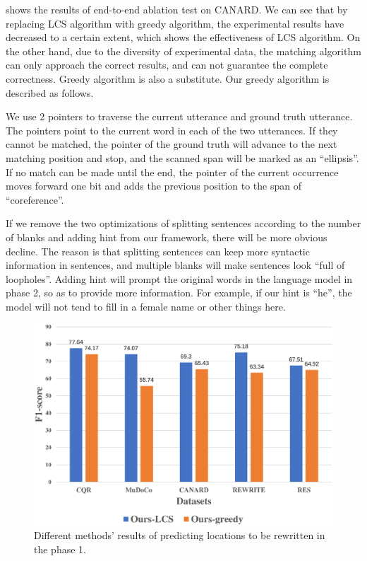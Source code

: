  shows the results of end-to-end ablation test on CANARD. We can see that by replacing LCS algorithm with greedy algorithm, the experimental results have decreased to a certain extent, which shows the effectiveness of LCS algorithm. On the other hand, due to the diversity of experimental data, the matching algorithm can only approach the correct results, and can not guarantee the complete correctness. Greedy algorithm is also a substitute. Our greedy algorithm is described as follows.



We use 2 pointers to traverse the current utterance and ground truth utterance. The pointers point to the current word in each of the two utterances. If they cannot be matched, the pointer of the ground truth will advance to the next matching position and stop, and the scanned span will be marked as an ``ellipsis''. If no match can be made until the end, the pointer of the current occurrence moves forward one bit and adds the previous position to the span of ``coreference''.

If we remove the two optimizations of splitting sentences according to the number of blanks and adding hint from our framework, there will be more obvious decline. The reason is that splitting sentences can keep more syntactic information in sentences, and multiple blanks will make sentences look ``full of loopholes''. Adding hint will prompt the original words in the language model in phase 2, so as to provide more information. For example, if our hint is ``he'', the model will not tend to fill in a female name or other things here.


\begin{figure}[th]
        \centering
        \includegraphics[width=1.0\columnwidth]{result-phase-1.eps}
        \caption{Different methods' results of predicting locations to be rewritten in the phase 1.}
        \label{fig:result-phase-1}
\end{figure}

